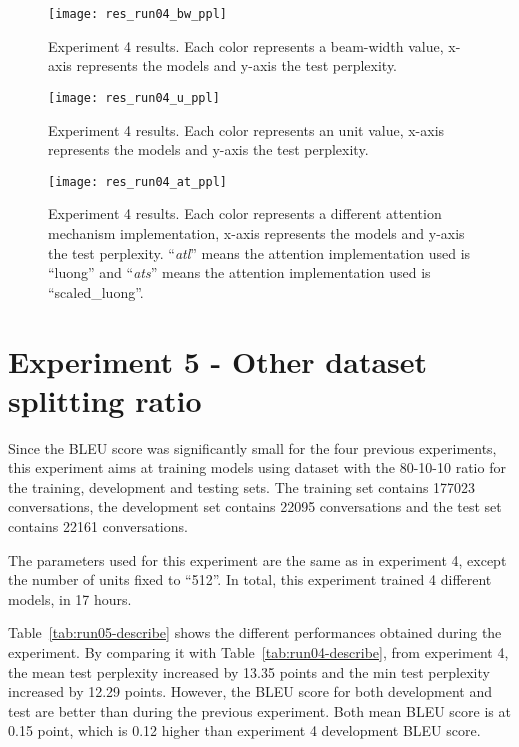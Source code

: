 \begin{landscape}
\begin{figure}
    \centering
    \texttt{[image: res\_run04\_bw\_ppl]}
    \decoRule
    \caption[Results experiment 4 BW-PPL]{Experiment 4 results. Each color represents a beam-width value, x-axis represents the models and y-axis the test perplexity.}
    \label{fig:res_run04_bw_ppl}
\end{figure}
\begin{figure}
    \centering
    \texttt{[image: res\_run04\_u\_ppl]}
    \decoRule
    \caption[Results experiment 4 U-PPL]{Experiment 4 results. Each color represents an unit value, x-axis represents the models and y-axis the test perplexity.}
    \label{fig:res_run04_u_ppl}
\end{figure}
\begin{figure}
    \centering
    \texttt{[image: res\_run04\_at\_ppl]}
    \decoRule
    \caption[Results experiment 4 AT-PPL]{Experiment 4 results. Each color represents a different attention mechanism implementation, x-axis represents the models and y-axis the test perplexity. ``\textit{atl}'' means the attention implementation used is ``luong'' and ``\textit{ats}'' means the attention implementation used is ``scaled\_luong''.}
    \label{fig:res_run04_at_ppl}
\end{figure}
\end{landscape}

\section{Experiment 5 - Other dataset splitting ratio}
Since the BLEU score was significantly small for the four previous experiments, this experiment aims at training models using dataset with the 80-10-10 ratio for the training, development and testing sets. The training set contains \num{177023} conversations, the development set contains \num{22095} conversations and the test set contains \num{22161} conversations.

The parameters used for this experiment are the same as in experiment 4, except the number of units fixed to ``512''. In total, this experiment trained 4 different models, in 17 hours.

Table~\ref{tab:run05-describe} shows the different performances obtained during the experiment. By comparing it with Table~\ref{tab:run04-describe}, from experiment 4, the mean test perplexity increased by \num{13.35} points and the min test perplexity increased by \num{12.29} points. However, the BLEU score for both development and test are better than during the previous experiment. Both mean BLEU score is at \num{0.15} point, which is \num{0.12} higher than experiment 4 development BLEU score.

